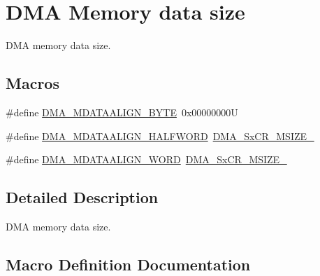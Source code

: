 \hypertarget{group___d_m_a___memory__data__size}{}\section{D\+MA Memory data size}
\label{group___d_m_a___memory__data__size}


D\+MA memory data size.  


\subsection*{Macros}
\begin{DoxyCompactItemize}
\item 
\#define \mbox{\hyperlink{group___d_m_a___memory__data__size_ga9ed07bddf736298eba11508382ea4d51}{D\+M\+A\+\_\+\+M\+D\+A\+T\+A\+A\+L\+I\+G\+N\+\_\+\+B\+Y\+TE}}~0x00000000U
\item 
\#define \mbox{\hyperlink{group___d_m_a___memory__data__size_ga2c7355971c0da34a7ffe50ec87403071}{D\+M\+A\+\_\+\+M\+D\+A\+T\+A\+A\+L\+I\+G\+N\+\_\+\+H\+A\+L\+F\+W\+O\+RD}}~\mbox{\hyperlink{group___peripheral___registers___bits___definition_ga39adb60b3394b61366691b45b8c2b80f}{D\+M\+A\+\_\+\+Sx\+C\+R\+\_\+\+M\+S\+I\+Z\+E\+\_}}
\item 
\#define \mbox{\hyperlink{group___d_m_a___memory__data__size_ga8812da819f18c873249074f3920220b2}{D\+M\+A\+\_\+\+M\+D\+A\+T\+A\+A\+L\+I\+G\+N\+\_\+\+W\+O\+RD}}~\mbox{\hyperlink{group___peripheral___registers___bits___definition_gaa5c2ef08ab52de52b4e1fd785f60e263}{D\+M\+A\+\_\+\+Sx\+C\+R\+\_\+\+M\+S\+I\+Z\+E\+\_}}
\end{DoxyCompactItemize}


\subsection{Detailed Description}
D\+MA memory data size. 



\subsection{Macro Definition Documentation}
\mbox{\label{group___d_m_a___memory__data__size_ga9ed07bddf736298eba11508382ea4d51}} 
